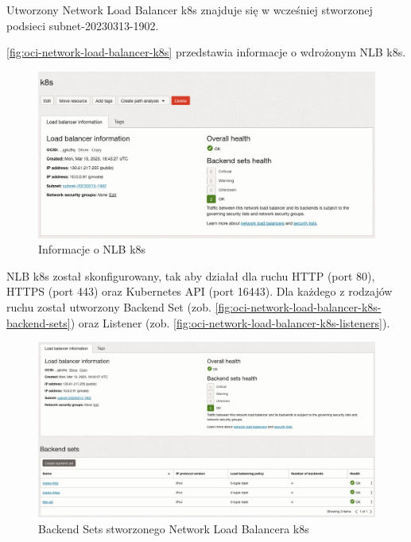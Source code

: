 Utworzony Network Load Balancer k8s znajduje się w wcześniej stworzonej podsieci subnet-20230313-1902.

\autoref{fig:oci-network-load-balancer-k8s} przedstawia informacje o wdrożonym NLB k8s.

\begin{figure}[H]
    \centering
    \includegraphics[width=\textwidth]{img/oci-network-load-balancer-k8s}
    \caption{Informacje o NLB k8s}
    \label{fig:oci-network-load-balancer-k8s}
\end{figure}

NLB k8s został skonfigurowany, tak aby działał dla ruchu HTTP (port 80), HTTPS (port 443) oraz Kubernetes API (port 16443).
Dla każdego z rodzajów ruchu został utworzony Backend Set (zob. \autoref{fig:oci-network-load-balancer-k8s-backend-sets}) oraz Listener (zob. \autoref{fig:oci-network-load-balancer-k8s-listeners}).

\begin{figure}[H]
    \centering
    \includegraphics[width=\textwidth]{img/oci-network-load-balancer-k8s-backend-sets}
    \caption{Backend Sets stworzonego Network Load Balancera k8s}
    \label{fig:oci-network-load-balancer-k8s-backend-sets}
\end{figure}

